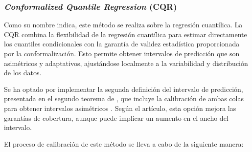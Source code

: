 



\subsubsection{\textit{Conformalized Quantile Regression} (CQR)}

Como su nombre indica, este método se realiza sobre la regresión cuantílica. La \acrshort{CQR} \cite{romano2019} combina la flexibilidad de la regresión cuantílica para estimar directamente los cuantiles condicionales con la garantía de validez estadística proporcionada por la conformalización. Esto permite obtener intervalos de predicción que son asimétricos y adaptativos, ajustándose localmente a la variabilidad y distribución de los datos.

Se ha optado por implementar la segunda definición del intervalo de predicción, presentada en el segundo teorema de \cite{romano2019}, que incluye la calibración de ambas colas para obtener intervalos asimétricos \cite{linusson2014}. Según el artículo, esta opción mejora las garantías de cobertura, aunque puede implicar un aumento en el ancho del intervalo.

El proceso de calibración de este método se lleva a cabo de la siguiente manera: 

